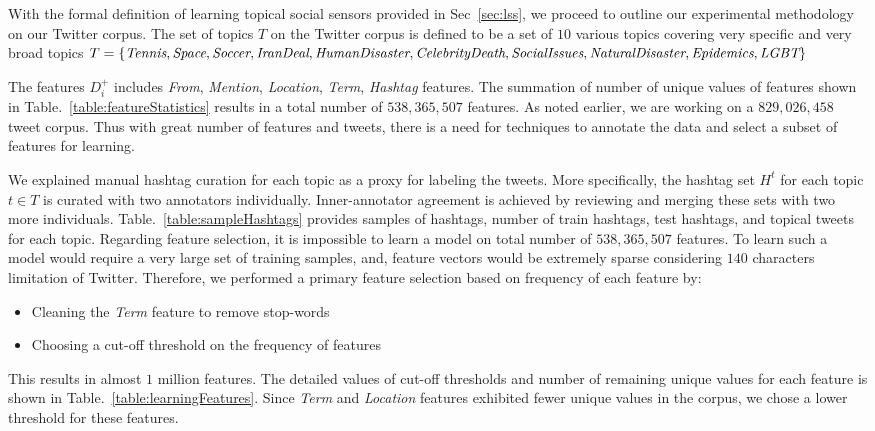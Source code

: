 %
%
With the formal definition of learning topical social sensors provided in Sec~\ref{sec:lss}, we proceed to outline our experimental methodology on our Twitter corpus. The set of topics $T$ on the Twitter corpus is defined to be a set of $10$ various topics covering very specific and very broad topics $T = \{ \textit{Tennis}, \textit{Space}, \textit{Soccer}, \textit{IranDeal}, \textit{HumanDisaster}, \\
\textit{CelebrityDeath}, \textit{SocialIssues}, \textit{NaturalDisaster}, \textit{Epidemics}, \\
 \textit{LGBT} \}$ 

The features $D_{i}^{+}$ includes \textit{From}, \textit{Mention}, \textit{Location}, \textit{Term}, \textit{Hashtag} features. The summation of number of unique values of features shown in Table.~\ref{table:featureStatistics} results in a total number of $538,365,507$ features. As noted earlier, we are working on a $829,026,458$ tweet corpus. Thus with great number of features and tweets, there is a need for techniques to annotate the data and select a subset of features for learning. 

We explained manual hashtag curation for each topic as a proxy for labeling the tweets. More specifically, the hashtag set $H^{t}$ for each topic $t \in T$ is curated with two annotators individually. Inner-annotator agreement is achieved by reviewing and merging these sets with two more individuals. Table.~\ref{table:sampleHashtags} provides samples of hashtags, number of train hashtags, test hashtags, and topical tweets for each topic.
Regarding feature selection, it is impossible to learn a model on total number of $538,365,507$ features. To learn such a model would require a very large set of training samples, and, feature vectors would be extremely sparse considering $140$ characters limitation of Twitter. Therefore, we performed a primary feature selection based on frequency of each feature by:
\begin{itemize}
\item Cleaning the \textit{Term} feature to remove stop-words
\item Choosing a cut-off threshold on the frequency of features
\end{itemize} 
This results in almost $1$ million features. The detailed values of cut-off thresholds and number of remaining unique values for each feature is shown in Table.~\ref{table:learningFeatures}. Since \textit{Term} and \textit{Location} features exhibited fewer unique values in the corpus, we chose a lower threshold for these features.

